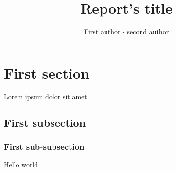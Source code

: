 \documentclass[12pt]{article}
\title{
  Report's title
}
\author{First author - second author}
\begin{document}
\maketitle
\tableofcontents
\pagebreak

\section{First section}
Lorem ipsum dolor sit amet

\subsection{First subsection}
\subsubsection{First sub-subsection}
Hello world




\end{document}
